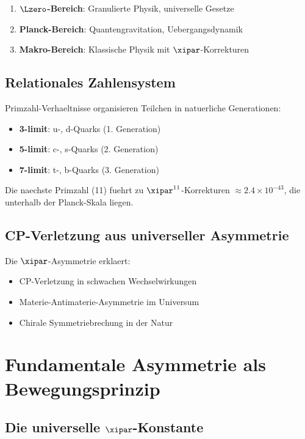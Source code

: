 	\begin{enumerate}
		\item \textbf{$\Lzero$-Bereich}: Granulierte Physik, universelle Gesetze
		\item \textbf{Planck-Bereich}: Quantengravitation, Uebergangsdynamik
		\item \textbf{Makro-Bereich}: Klassische Physik mit $\xipar$-Korrekturen
	\end{enumerate}
	
	\subsection{Relationales Zahlensystem}
	
	Primzahl-Verhaeltnisse organisieren Teilchen in natuerliche Generationen:
	
	\begin{itemize}
		\item \textbf{3-limit}: u-, d-Quarks (1. Generation)
		\item \textbf{5-limit}: c-, s-Quarks (2. Generation)
		\item \textbf{7-limit}: t-, b-Quarks (3. Generation)
	\end{itemize}
	
	Die naechste Primzahl (11) fuehrt zu $\xipar^{11}$-Korrekturen $\approx 2.4 \times 10^{-43}$, die unterhalb der Planck-Skala liegen.
	
	\subsection{CP-Verletzung aus universeller Asymmetrie}
	
	Die $\xipar$-Asymmetrie erklaert:
	\begin{itemize}
		\item CP-Verletzung in schwachen Wechselwirkungen
		\item Materie-Antimaterie-Asymmetrie im Universum
		\item Chirale Symmetriebrechung in der Natur
	\end{itemize}
	
	\section{Fundamentale Asymmetrie als Bewegungsprinzip}
	
	\subsection{Die universelle $\xipar$-Konstante}
	
